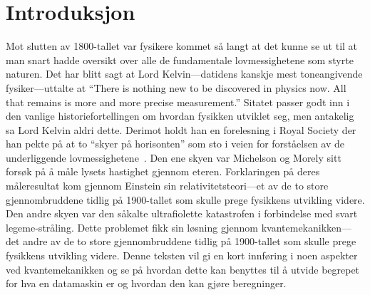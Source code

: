 \documentclass[a4paper,norsk,12pt]{book}
\begin{document}
\tableofcontents

\chapter{Introduksjon}
Mot slutten av 1800-tallet var fysikere kommet så langt at det kunne se ut til at man snart hadde oversikt over alle de fundamentale lovmessighetene som styrte naturen. Det har blitt sagt at Lord Kelvin---datidens kanskje mest toneangivende fysiker---uttalte at ``There is nothing new to be discovered in physics now. All that remains is more and more precise measurement.'' Sitatet passer godt inn i den vanlige historiefortellingen om hvordan fysikken utviklet seg, men antakelig sa Lord Kelvin aldri dette. Derimot holdt han en forelesning i Royal Society der han pekte på at to ``skyer på horisonten'' som sto i veien for forståelsen av de underliggende lovmessighetene~\cite{doi:10.1080/14786440109462664}. Den ene skyen var Michelson og Morely sitt forsøk på å måle lysets hastighet gjennom eteren. Forklaringen på deres måleresultat kom gjennom Einstein sin relativitetsteori---et av de to store gjennombruddene tidlig på 1900-tallet som skulle prege fysikkens utvikling videre. Den andre skyen var den såkalte ultrafiolette katastrofen i forbindelse med svart legeme-stråling. Dette problemet fikk sin løsning gjennom kvantemekanikken---det andre av de to store gjennombruddene tidlig på 1900-tallet som skulle prege fysikkens utvikling videre. Denne teksten vil gi en kort innføring i noen aspekter ved kvantemekanikken og se på hvordan dette kan benyttes til å utvide begrepet for hva en datamaskin er og hvordan den kan gjøre beregninger.











\end{document}
